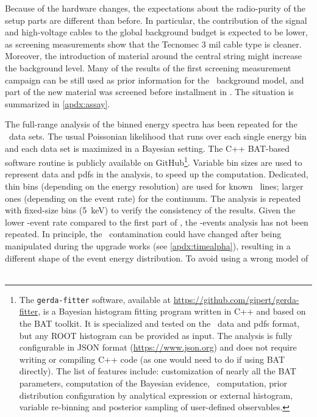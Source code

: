 Because of the hardware changes, the expectations about the radio-purity of
the setup parts are different than before. In particular, the contribution of the signal
and high-voltage cables to the global background budget is expected to be lower, as
screening measurements show that the Tecnomec 3 mil cable type is cleaner. Moreover, the
introduction of material around the central string might increase the background level.
Many of the results of the first screening measurement campaign can be still used as prior
information for the \phasetwop\ background model, and part of the new material was
screened before installment in \gerda. The situation is summarized in \cref{apdx:assay}.

The full-range analysis of the binned energy spectra has been repeated for the \phasetwop\
data sets. The usual Poissonian likelihood that runs over each single energy bin and each
data set is maximized in a Bayesian setting. The C++ BAT-based~\cite{Caldwell2008}
software routine is publicly available on GitHub\footnote{\label{footnote:gerda-fitter}%
  The \texttt{gerda-fitter} software, available at
  \url{https://github.com/gipert/gerda-fitter}, is a Bayesian histogram fitting program
  written in C++ and based on the BAT toolkit. It is specialized and tested on the \gerda\
  data and pdfs format, but any ROOT histogram can be provided as input. The analysis is
  fully configurable in JSON format (\url{https://www.json.org}) and does not require
  writing or compiling C++ code (as one would need to do if using BAT directly). The list
  of features include: customization of nearly all the BAT parameters, computation of the
  Bayesian evidence, \pvalue\ computation, prior distribution configuration by
  analytical expression or external histogram, variable re-binning and posterior sampling of
  user-defined observables.
}. Variable bin sizes are used to represent data and pdfs in the analysis, to speed up the
computation. Dedicated, thin bins (depending on the energy resolution) are used for known
\g\ lines; larger ones (depending on the event rate) for the continuum. The analysis is
repeated with fixed-size bins (5~keV) to verify the consistency of the results.
\newpar
Given the lower \a-event rate compared to the first part of \phasetwo, the \a-events
analysis has not been repeated. In principle, the \Po\ contamination could have changed
after being manipulated during the upgrade works (see \cref{apdx:timealpha}), resulting in
a different shape of the event energy distribution. To avoid using a wrong model of \a\
